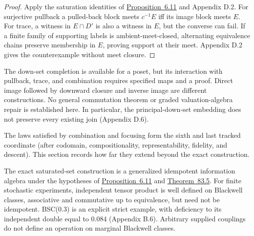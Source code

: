 \begin{proof}

Apply the saturation identities of \hyperlink{stmt:6.11}{Proposition~6.11} and Appendix D.2. For surjective pullback a pulled-back block meets \(c^{-1}E\) iff its image block meets \(E\). For trace, a witness in \(E\cap D'\) is also a witness in \(E\), but the converse can fail. If a finite family of supporting labels is ambient-meet-closed, alternating equivalence chains preserve membership in \(E\), proving support at their meet. Appendix D.2 gives the counterexample without meet closure.
\end{proof}

\begin{thmrem}

The down-set completion is available for a poset, but its interaction with pullback, trace, and combination requires specified maps and a proof. Direct image followed by downward closure and inverse image are different constructions. No general commutation theorem or graded valuation-algebra repair is established here. In particular, the principal-down-set embedding does not preserve every existing join (Appendix D.6).
\end{thmrem}


The laws satisfied by combination and focusing form the sixth and last tracked coordinate (after codomain, compositionality, representability, fidelity, and descent). This section records how far they extend beyond the exact construction.

\begin{thmplain}

The exact saturated-set construction is a generalized idempotent information algebra under the hypotheses of \hyperlink{stmt:6.11}{Proposition~6.11} and \hyperlink{stmt:83.5}{Theorem~83.5}. For finite stochastic experiments, independent tensor product is well defined on Blackwell classes, associative and commutative up to equivalence, but need not be idempotent. BSC(0.3) is an explicit strict example, with deficiency to its independent double equal to 0.084 (Appendix B.6). Arbitrary supplied couplings do not define an operation on marginal Blackwell classes.
\end{thmplain}

